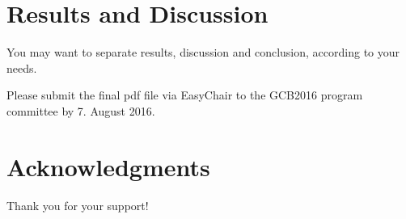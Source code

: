 \documentclass[fleqn,10pt,twoside]{gcb15submission}
\begin{document}



\section*{Results and Discussion}

You may want to separate results, discussion and conclusion, according to your needs.

Please submit the final pdf file via EasyChair to the GCB2016 program committee by 7. August 2016. 


\section*{Acknowledgments}
Thank you for your support!



\end{document}
